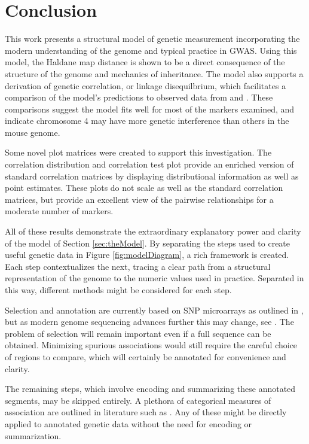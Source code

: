 \documentclass[12pt]{article}
\begin{document}
\section{Conclusion} \label{sec:conclusion}

This work presents a structural model of genetic measurement incorporating the modern understanding of the genome and typical practice in GWAS. Using this model, the Haldane map distance is shown to be a direct consequence of the structure of the genome and mechanics of inheritance. The model also supports a derivation of genetic correlation, or linkage disequilbrium, which facilitates a comparison of the model's predictions to observed data from \cite{roweetal1994jaxbsb} and \cite{welchetal1996uclabsb}. These comparisons suggest the model fits well for most of the markers examined, and indicate chromosome 4 may have more genetic interference than others in the mouse genome.

Some novel plot matrices were created to support this investigation. The correlation distribution and correlation test plot provide an enriched version of standard correlation matrices by displaying distributional information as well as point estimates. These plots do not scale as well as the standard correlation matrices, but provide an excellent view of the pairwise relationships for a moderate number of markers.

All of these results demonstrate the extraordinary explanatory power and clarity of the model of Section \ref{sec:theModel}. By separating the steps used to create useful genetic data in Figure \ref{fig:modelDiagram}, a rich framework is created. Each step contextualizes the next, tracing a clear path from a structural representation of the genome to the numeric values used in practice. Separated in this way, different methods might be considered for each step.

Selection and annotation are currently based on SNP microarrays as outlined in \cite{laframboise2009}, but as modern genome sequencing advances further this may change, see \cite{heatherchain2016sequencers, hasinetal2017multi, uffelmannetal2021gwas}. The problem of selection will remain important even if a full sequence can be obtained. Minimizing spurious associations would still require the careful choice of regions to compare, which will certainly be annotated for convenience and clarity.

The remaining steps, which involve encoding and summarizing these annotated segments, may be skipped entirely. A plethora of categorical measures of association are outlined in literature such as \cite{goodmankruskal1979measures}. Any of these might be directly applied to annotated genetic data without the need for encoding or summarization.
\end{document}
